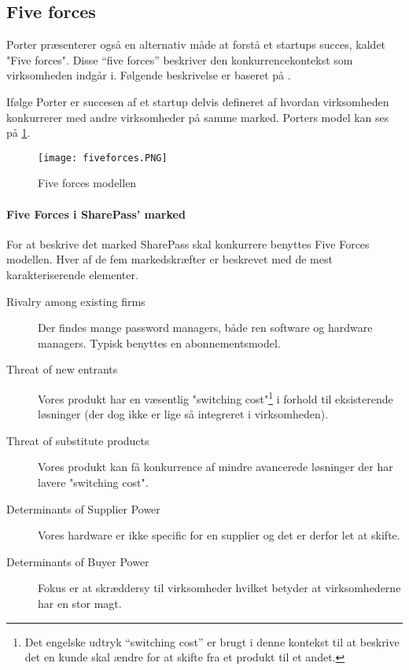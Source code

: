 \subsection{Five forces}
 Porter præsenterer også en alternativ måde at forstå et startups succes, kaldet "Five forces".
 Disse ``five forces'' beskriver den konkurrencekontekst som virksomheden indgår i.
 Følgende beskrivelse er baseret på \citet[p.~16]{rose2012software}.

 Ifølge Porter er succesen af et startup delvis defineret af hvordan virksomheden konkurrerer med andre virksomheder på samme marked.
 Porters model kan ses på \cref{fiveforces}.

\begin{figure}[H]
	\texttt{[image: fiveforces.PNG]}
	\caption{Five forces modellen}
	\label{fiveforces}
\end{figure}

\paragraph{Five Forces i SharePass' marked}
\label{par:five_forces_i_sharepass_marked}

For at beskrive det marked SharePass skal konkurrere benyttes Five Forces modellen. 
Hver af de fem markedskræfter er beskrevet med de mest karakteriserende elementer.

\begin{description}
	\item[Rivalry among existing firms] Der findes mange password managers, både ren software og hardware managers. Typisk benyttes en abonnementsmodel.
	\item[Threat of new entrants] Vores produkt har en væsentlig "switching cost"\footnote{Det engelske udtryk ``switching cost'' er brugt i denne kontekst til at beskrive det en kunde skal ændre for at skifte fra et produkt til et andet.}  i forhold til eksisterende løsninger (der dog ikke er lige så integreret i virksomheden). 
	\item [Threat of substitute products] Vores produkt kan få konkurrence af mindre avancerede løsninger der har lavere "switching cost".
	\item [Determinants of Supplier Power] Vores hardware er ikke specific for en supplier og det er derfor let at skifte. 
	\item [Determinants of Buyer Power] Fokus er at skræddersy til virksomheder hvilket betyder at virksomhederne har en stor magt.
\end{description}
